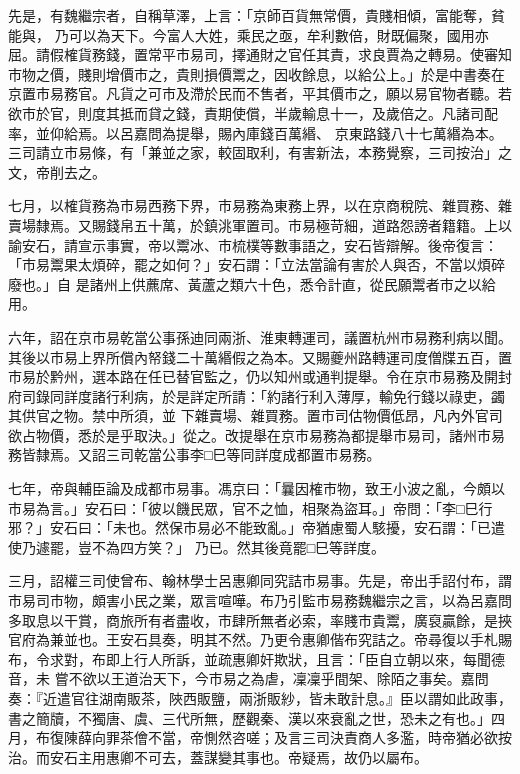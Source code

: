 \begin{pinyinscope}
 先是，有魏繼宗者，自稱草澤，上言：「京師百貨無常價，貴賤相傾，富能奪，貧能與，
 乃可以為天下。今富人大姓，乘民之亟，牟利數倍，財既偏聚，國用亦屈。請假榷貨務錢，置常平市易司，擇通財之官任其責，求良賈為之轉易。使審知市物之價，賤則增價市之，貴則損價鬻之，因收餘息，以給公上。」於是中書奏在京置市易務官。凡貨之可市及滯於民而不售者，平其價市之，願以易官物者聽。若欲市於官，則度其抵而貸之錢，責期使償，半歲輸息十一，及歲倍之。凡諸司配率，並仰給焉。以呂嘉問為提舉，賜內庫錢百萬緡、
 京東路錢八十七萬緡為本。三司請立市易條，有「兼並之家，較固取利，有害新法，本務覺察，三司按治」之文，帝削去之。



 七月，以榷貨務為市易西務下界，市易務為東務上界，以在京商稅院、雜買務、雜賣場隸焉。又賜錢帛五十萬，於鎮洮軍置司。市易極苛細，道路怨謗者籍籍。上以諭安石，請宣示事實，帝以鬻冰、市梳樸等數事語之，安石皆辯解。後帝復言：「市易鬻果太煩碎，罷之如何？」安石謂：「立法當論有害於人與否，不當以煩碎廢也。」自
 是諸州上供藨席、黃蘆之類六十色，悉令計直，從民願鬻者市之以給用。



 六年，詔在京市易乾當公事孫迪同兩浙、淮東轉運司，議置杭州市易務利病以聞。其後以市易上界所償內帑錢二十萬緡假之為本。又賜夔州路轉運司度僧牒五百，置市易於黔州，選本路在任已替官監之，仍以知州或通判提舉。令在京市易務及開封府司錄同詳度諸行利病，於是詳定所請：「約諸行利入薄厚，輸免行錢以祿吏，蠲其供官之物。禁中所須，並
 下雜賣場、雜買務。置市司估物價低昂，凡內外官司欲占物價，悉於是乎取決。」從之。改提舉在京市易務為都提舉市易司，諸州市易務皆隸焉。又詔三司乾當公事李□巳等同詳度成都置市易務。



 七年，帝與輔臣論及成都市易事。馮京曰：「曩因榷市物，致王小波之亂，今頗以市易為言。」安石曰：「彼以饑民眾，官不之恤，相聚為盜耳。」帝問：「李□巳行邪？」安石曰：「未也。然保市易必不能致亂。」帝猶慮蜀人駭擾，安石謂：「已遣使乃遽罷，豈不為四方笑？」
 乃已。然其後竟罷□巳等詳度。



 三月，詔權三司使曾布、翰林學士呂惠卿同究詰市易事。先是，帝出手詔付布，謂市易司市物，頗害小民之業，眾言喧嘩。布乃引監市易務魏繼宗之言，以為呂嘉問多取息以干賞，商旅所有者盡收，市肆所無者必索，率賤市貴鬻，廣裒贏餘，是挾官府為兼並也。王安石具奏，明其不然。乃更令惠卿偕布究詰之。帝尋復以手札賜布，令求對，布即上行人所訴，並疏惠卿奸欺狀，且言：「臣自立朝以來，每聞德音，未
 嘗不欲以王道治天下，今市易之為虐，凜凜乎間架、除陌之事矣。嘉問奏：『近遣官往湖南販茶，陜西販鹽，兩浙販紗，皆未敢計息。』臣以謂如此政事，書之簡牘，不獨唐、虞、三代所無，歷觀秦、漢以來衰亂之世，恐未之有也。」四月，布復陳薛向罪茶儈不當，帝惻然咨嗟；及言三司決責商人多濫，時帝猶必欲按治。而安石主用惠卿不可去，蓋謀變其事也。帝疑焉，故仍以屬布。




\end{pinyinscope}

